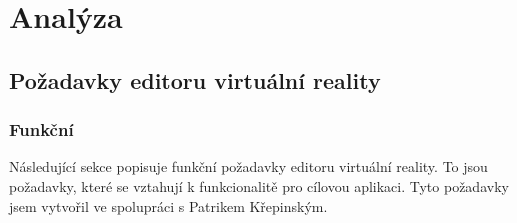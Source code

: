 \documentclass[thesis=B,czech]{FITthesis}[2012/06/26]
\begin{document}
\chapter{Analýza}
    \section{Požadavky editoru virtuální reality}
        \subsection{Funkční} \label{sec:analFP}
            Následující sekce popisuje funkční požadavky editoru virtuální reality. To jsou požadavky, které se vztahují k funkcionalitě pro cílovou aplikaci. Tyto požadavky jsem vytvořil ve spolupráci s Patrikem Křepinským.
            
\end{document}

